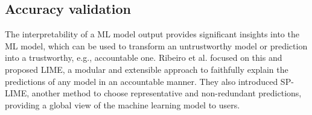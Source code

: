 



\subsection{\textbf{Accuracy validation}}
The interpretability of a ML model output provides significant insights into the ML model, which can be used to transform an untrustworthy model or prediction into a trustworthy, e.g., accountable one. Ribeiro et al. \cite{ribeiro2016should} focused on this and proposed LIME, a modular and extensible approach to faithfully explain the predictions of any model in an accountable manner. They also introduced SP-LIME, another method to choose representative and non-redundant predictions, providing a global view of the machine learning model to users.

